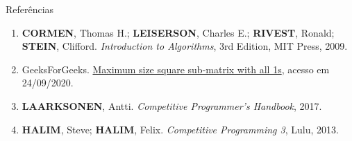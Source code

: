 \begin{frame}[fragile]{Referências}

    \begin{enumerate}
        \item \textbf{CORMEN}, Thomas H.; \textbf{LEISERSON}, Charles E.; \textbf{RIVEST},
            Ronald; \textbf{STEIN}, Clifford. \textit{Introduction to Algorithms}, 3rd Edition,
            MIT Press, 2009.

        \item GeeksForGeeks. \href{https://www.geeksforgeeks.org/maximum-size-sub-matrix-with-all-1s-in-a-binary-matrix/}{Maximum size square sub-matrix with all 1s}, acesso em 24/09/2020.
 
        \item \textbf{LAARKSONEN}, Antti. \textit{Competitive Programmer's Handbook}, 2017.

        \item \textbf{HALIM}, Steve; \textbf{HALIM}, Felix. \textit{Competitive Programming 3}, Lulu, 2013.
    \end{enumerate}

\end{frame}
